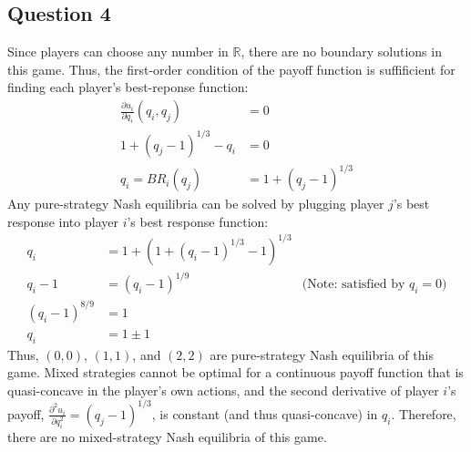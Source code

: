 \documentclass{article}
\newcommand{\R}{\mathbb{R}}
\begin{document}
\subsection*{Question 4}
Since players can choose any number in $\R$, there are no boundary solutions in this game. Thus, the first-order condition of the payoff function is suffificient for finding each player's best-reponse function:
\begin{align*}
	\frac{\partial u_i}{\partial q_i}(q_i,q_j) &= 0	\\
	1 + (q_j-1)^{1/3} - q_i &= 0	\\
	q_i = BR_i(q_j) &= 1 + (q_j-1)^{1/3}
\end{align*}
Any pure-strategy Nash equilibria can be solved by plugging player $j$'s best response into player $i$'s best response function:
\begin{align*}
	q_i &= 1 + \left(1 + (q_i-1)^{1/3}-1\right)^{1/3}	\\
	q_i - 1 &= (q_i-1)^{1/9}	&\text{(Note: satisfied by }q_i=0\text{)}\\
	(q_i - 1)^{8/9} &= 	1	\\
	q_i &= 1 \pm 1
\end{align*}
Thus, $(0,0)$, $(1,1)$, and $(2,2)$ are pure-strategy Nash equilibria of this game. Mixed strategies cannot be optimal for a continuous payoff function that is quasi-concave in the player's own actions, and the second derivative of player $i$'s payoff, ${\frac{\partial^2 u_i}{\partial q_i^2} = (q_j-1)^{1/3}}$, is constant (and thus quasi-concave) in $q_i$. Therefore, there are no mixed-strategy Nash equilibria of this game.

\pagebreak
\end{document}
